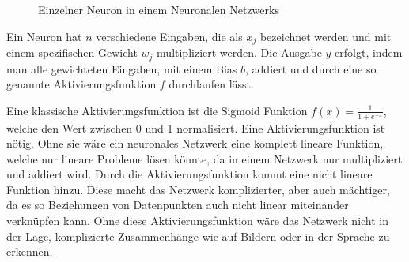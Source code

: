 \documentclass[12pt,a4paper]{report}
\begin{document}
\begin{figure}[h]
    \centering
{}
    \caption{Einzelner Neuron in einem Neuronalen Netzwerks}
    \label{fig:neuron1}
\end{figure}

Ein Neuron hat $n$ verschiedene Eingaben, die als $x_j$ bezeichnet werden und mit einem spezifischen Gewicht $w_j$ multipliziert werden.
Die Ausgabe $y$ erfolgt, indem man alle gewichteten Eingaben, mit einem Bias $b$, addiert und durch eine so genannte
Aktivierungsfunktion $f$ durchlaufen lässt.

Eine klassische Aktivierungsfunktion ist die Sigmoid Funktion $f(x) = \frac{1}{1 + e^{-x}}$, welche den Wert zwischen 0 und 1 normalisiert.
Eine Aktivierungsfunktion ist nötig.
Ohne sie wäre ein neuronales Netzwerk eine komplett lineare Funktion,
welche nur lineare Probleme lösen könnte\cite{activations}, da in einem Netzwerk nur multipliziert und addiert wird.
Durch die Aktivierungsfunktion kommt eine nicht lineare Funktion hinzu.
Diese macht das Netzwerk komplizierter,
aber auch mächtiger, da es so Beziehungen von Datenpunkten auch nicht linear miteinander verknüpfen kann.
Ohne diese Aktivierungsfunktion wäre das Netzwerk nicht in der Lage, komplizierte Zusammenhänge wie auf Bildern oder in der Sprache zu erkennen\cite{activations}.
\end{document}
